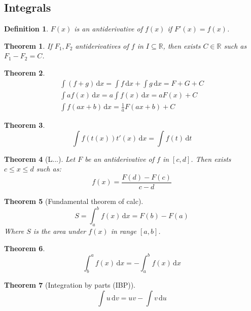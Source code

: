 \documentclass[]{article}
\newtheorem{theorem}{Theorem}[section]
\newtheorem{definition}{Definition}[section]
\newcommand\R     {\mathbb{R}}
\newcommand\dx    {\,\mathrm{d}x}
\newcommand\dt    {\,\mathrm{d}t}
\newcommand\du    {\,\mathrm{d}u}
\newcommand\dv    {\,\mathrm{d}v}
\begin{document}
\begin{multicols}{2}
		\section{Integrals}
		\begin{definition}
			$F(x)$ is an antiderivative of $f(x)$ if $F'(x) = f(x)$. 
		\end{definition}
		\begin{theorem}
			If $F_1, F_2$ antiderivatives of $f$ in $I \subseteq \R$, then exists $C \in \R$ such as $F_1 - F_2 = C$. 
		\end{theorem}
		\begin{theorem}
			\begin{gather*}
				\int (f + g)\dx = \int f\dx + \int g \dx = F + G + C \\
				\int af(x) \dx = a \int f(x)\dx = aF(x) + C \\
				\int f(ax + b)\dx  = \frac{1}{a} F(ax + b) + C
			\end{gather*}
		\end{theorem}
		\begin{theorem}
			\[ \int f(t(x))t'(x)\dx = \int f(t)\dt \]
		\end{theorem}
		\begin{theorem}[L...]
			Let $F$ be an antiderivative of $f$ in $[c, d]$. Then exists $c \le x \le d$ such as: 
			\[ f(x) = \frac{F(d) - F(c)}{c - d} \]
		\end{theorem}
		\begin{theorem}[Fundamental theorem of calc]
			\[ S = \int^b_a f(x)\dx = F(b) - F(a) \]
			Where $S$ is the area under $f(x)$ in range $[a, b]$. 
		\end{theorem}
		\begin{theorem}
			\[ \int^a_b f(x) \dx = -\int^b_a f(x) \dx \]
		\end{theorem}
		\begin{theorem}[Integration by parts (IBP)]
			\[ \int u\dv = uv - \int v\du \]
		\end{theorem}

\end{multicols}
\end{document}
